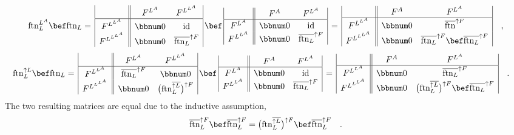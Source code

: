 \[
\text{ftn}_{L}^{L^{A}}\bef\text{ftn}_{L}=\,\begin{array}{|c||cc|}
 & F^{L^{A}} & F^{L^{L^{A}}}\\
\hline F^{L^{L^{A}}} & \bbnum 0 & \text{id}\\
F^{L^{L^{L^{A}}}} & \bbnum 0 & \overline{\text{ftn}_{L}}^{\uparrow F}
\end{array}\,\bef\,\begin{array}{|c||cc|}
 & F^{A} & F^{L^{A}}\\
\hline F^{L^{A}} & \bbnum 0 & \text{id}\\
F^{L^{L^{A}}} & \bbnum 0 & \overline{\text{ftn}_{L}}^{\uparrow F}
\end{array}\,=\,\begin{array}{|c||cc|}
 & F^{A} & F^{L^{A}}\\
\hline F^{L^{L^{A}}} & \bbnum 0 & \overline{\text{ftn}}^{\uparrow F}\\
F^{L^{L^{L^{A}}}} & \bbnum 0 & \overline{\text{ftn}_{L}}^{\uparrow F}\bef\overline{\text{ftn}_{L}}^{\uparrow F}
\end{array}\quad,
\]
\[
\negthickspace\negthickspace\negthickspace\negthickspace\text{ftn}_{L}^{\uparrow L}\bef\text{ftn}_{L}=\,\begin{array}{|c||cc|}
 & F^{L^{A}} & F^{L^{L^{A}}}\\
\hline F^{L^{L^{A}}} & \overline{\text{ftn}_{L}}^{\uparrow F} & \bbnum 0\\
F^{L^{L^{L^{A}}}} & \bbnum 0 & \big(\text{ftn}_{L}^{\overline{\uparrow L}}\big)^{\uparrow F}
\end{array}\,\bef\,\begin{array}{|c||cc|}
 & F^{A} & F^{L^{A}}\\
\hline F^{L^{A}} & \bbnum 0 & \text{id}\\
F^{L^{L^{A}}} & \bbnum 0 & \overline{\text{ftn}_{L}}^{\uparrow F}
\end{array}\,=\,\begin{array}{|c||cc|}
 & F^{A} & F^{L^{A}}\\
\hline F^{L^{L^{A}}} & \bbnum 0 & \overline{\text{ftn}_{L}}^{\uparrow F}\\
F^{L^{L^{L^{A}}}} & \bbnum 0 & \big(\text{ftn}_{L}^{\overline{\uparrow L}}\big)^{\uparrow F}\bef\overline{\text{ftn}_{L}}^{\uparrow F}
\end{array}\quad.
\]
The two resulting matrices are equal due to the inductive assumption,
\[
\overline{\text{ftn}}_{L}^{\uparrow F}\bef\overline{\text{ftn}}_{L}^{\uparrow F}=\big(\text{ftn}_{L}^{\overline{\uparrow L}}\big)^{\uparrow F}\bef\overline{\text{ftn}}_{L}^{\uparrow F}\quad.
\]

